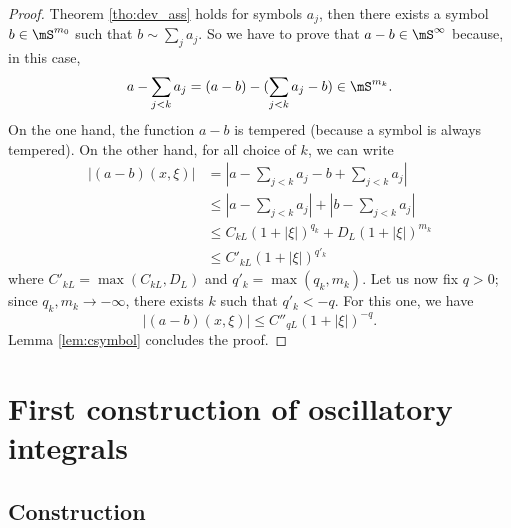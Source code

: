 \begin{proof}
Theorem \ref{tho:dev_ass} holds for symbols $a_j$, then there exists a symbol $b\in\mS^{m_0}$ such that $b\sim\sum_{j}a_j$. So we have to prove that $a-b\in\mS^{\infty}$ because, in this case, 
\[ 
a-\sum_{j<k}a_j=(a-b)-(\sum_{j<k}a_j-b)\in\mS^{m_k}.
\]
On the one hand, the function $a-b$ is tempered (because a symbol is always tempered). On the other hand, for all choice of $k$, we can write
\begin{equation}
\begin{aligned}
   |(a-b)(x,\xi)|&=|a-\sum_{j<k}a_j-b+\sum_{j<k}a_j|\\
                 &\leq|a-\sum_{j<k}a_j|+|b-\sum_{j<k}a_j|\\
                 &\leq C_{kL}(1+|\xi|)^{q_k}+D_L(1+|\xi|)^{m_k} \\
                 &\leq C'_{kL}(1+|\xi|)^{q'_k}
\end{aligned}
\end{equation}
where $C'_{kL}=\max(C_{kL},D_L)$ and $q'_k=\max(q_k,m_k)$. Let us now fix $q>0$; since $q_k,m_k\to-\infty$, there exists $k$ such that $q'_k<-q$. For this one, we have
\[ 
|(a-b)(x,\xi)|\leq C''_{qL}(1+|\xi|)^{-q}.
\]
Lemma \ref{lem:csymbol} concludes the proof.

 
\end{proof}


\section{First construction of oscillatory integrals}

\subsection{Construction}


